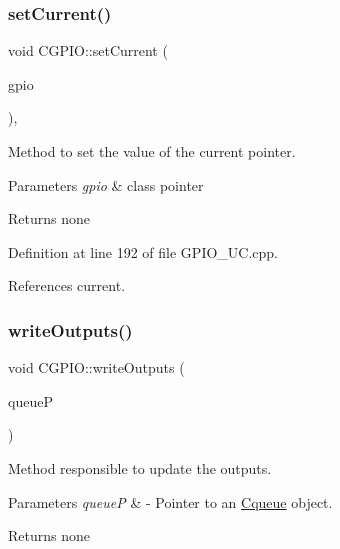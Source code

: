 \subsubsection{\texorpdfstring{set\+Current()}{setCurrent()}}
{\footnotesize\ttfamily void C\+G\+P\+I\+O\+::set\+Current (\begin{DoxyParamCaption}\item[{\mbox{\hyperlink{class_c_g_p_i_o}{C\+G\+P\+IO}} $\ast$}]{gpio }\end{DoxyParamCaption})\hspace{0.3cm}{\ttfamily [static]}, {\ttfamily [protected]}}



Method to set the value of the current pointer. 


\begin{DoxyParams}{Parameters}
{\em gpio} & class pointer \\
\hline
\end{DoxyParams}
\begin{DoxyReturn}{Returns}
none 
\end{DoxyReturn}


Definition at line 192 of file G\+P\+I\+O\+\_\+\+U\+C.\+cpp.



References current.

\mbox{\label{class_c_g_p_i_o_a512879113a7515680c76fac8852f69cc}} 
\subsubsection{\texorpdfstring{write\+Outputs()}{writeOutputs()}}
{\footnotesize\ttfamily void C\+G\+P\+I\+O\+::write\+Outputs (\begin{DoxyParamCaption}\item[{\mbox{\hyperlink{class_cqueue}{Cqueue}}$<$ string $>$ $\ast$}]{queueP }\end{DoxyParamCaption})\hspace{0.3cm}{\ttfamily [virtual]}}



Method responsible to update the outputs. 


\begin{DoxyParams}{Parameters}
{\em queueP} & -\/ Pointer to an \mbox{\hyperlink{class_cqueue}{Cqueue}} object. \\
\hline
\end{DoxyParams}
\begin{DoxyReturn}{Returns}
none 
\end{DoxyReturn}


